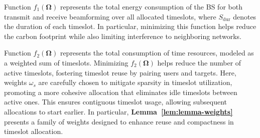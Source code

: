 \documentclass[10pt,journal,compsoc]{IEEEtran}
\theoremstyle{myremark}
\theoremstyle{myexample}
\begin{document}



Function $ f_1 \left( \boldsymbol{\Omega} \right) $ represents the total energy consumption of the \gls{BS} for both transmit and receive beamforming over all allocated timeslots, where $ S_\mathrm{dur} $ denotes the duration of each timeslot. In particular, minimizing this function helps reduce the carbon footprint while also limiting interference to neighboring networks.


Function $ f_2(\boldsymbol{\Omega}) $ represents the total consumption of time resources, modeled as a weighted sum of timeslots. Minimizing $ f_2(\boldsymbol{\Omega}) $ helps reduce the number of active timeslots, fostering timeslot reuse by pairing users and targets. Here, weights $ \omega_s $ are carefully chosen to mitigate sparsity in timeslot utilization, promoting a more cohesive allocation that eliminates idle timeslots between active ones. This ensures contiguous timeslot usage, allowing subsequent allocations to start earlier. In particular, \textbf{Lemma~\ref{lem:lemma-weights}} presents a family of weights designed to enhance reuse and compactness in timeslot allocation.

 
\end{document}
